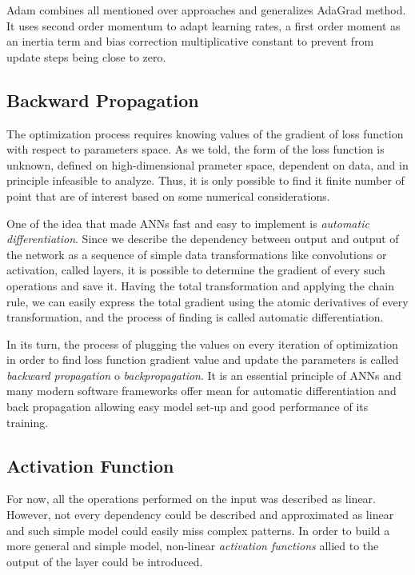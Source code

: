 Adam combines all mentioned over approaches and generalizes AdaGrad method.
It uses second order momentum to adapt learning rates, a first order moment as an inertia term and bias correction multiplicative constant to prevent from update steps being close to zero.

\subsection{Backward Propagation}

The optimization process requires knowing values of the gradient of loss function with respect to parameters space.
As we told, the form of the loss function is unknown, defined on high-dimensional prameter space, dependent on data, and in principle infeasible to analyze.
Thus, it is only possible to find it finite number of point that are of interest based on some numerical considerations.

\medskip
One of the idea that made ANNs fast and easy to implement is \emph{automatic differentiation}.
Since we describe the dependency between output and output of the network as a sequence of simple data transformations like convolutions or activation, called layers, it is possible to determine the gradient of every such operations and save it.
Having the total transformation and applying the chain rule, we can easily express the total gradient using the atomic derivatives of every transformation, and the process of finding is called automatic differentiation. 

\medskip
In its turn, the process of plugging the values on every iteration of optimization in order to find loss function gradient value and update the parameters is called \textit{backward propagation} o \emph{backpropagation}.
It is an essential principle of ANNs and many modern software frameworks offer mean for automatic differentiation and back propagation allowing easy model set-up and good performance of its training\cite{}.


\subsection{Activation Function}

For now, all the operations performed on the input was described as linear.
However, not every dependency could be described and approximated as linear and such simple model could easily miss complex patterns.
In order to build a more general and simple model, non-linear \emph{activation functions} allied to the output of the layer could be introduced.
\medskip

